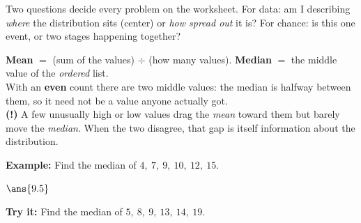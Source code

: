\documentclass[12pt]{article}
\begin{document}

\noindent\small Two questions decide every problem on the worksheet. For data:
am I describing \emph{where} the distribution sits (center) or \emph{how spread
out} it is? For chance: is this one event, or two stages happening together?
\normalsize

\begin{formulabox}
\textbf{Mean} $=$ (sum of the values) $\div$ (how many values). \quad
\textbf{Median} $=$ the middle value of the \emph{ordered} list.\\[3pt]
With an \textbf{even} count there are two middle values: the median is halfway
between them, so it need not be a value anyone actually got.\\[3pt]
\textbf{(!)} A few unusually high or low values drag the \emph{mean} toward
them but barely move the \emph{median}. When the two disagree, that gap is
itself information about the distribution.
\end{formulabox}
\begin{examplebox}
\textbf{Example:} Find the median of $4,\ 7,\ 9,\ 10,\ 12,\ 15$.
\par
$\ans{9.5}$
\end{examplebox}
\begin{tryitbox}
\textbf{Try it:} Find the median of $5,\ 8,\ 9,\ 13,\ 14,\ 19$.\\[2pt]
\end{tryitbox}
\end{document}
